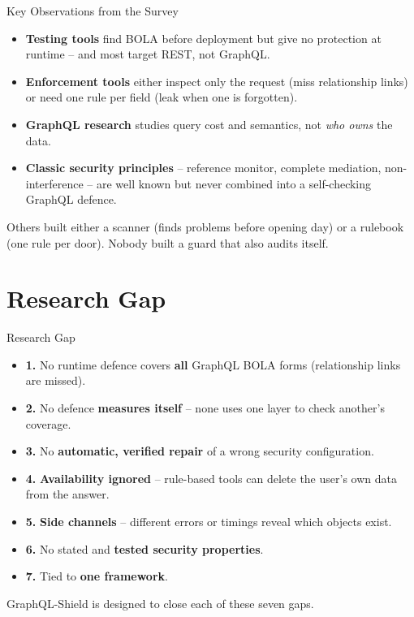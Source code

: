 \documentclass[aspectratio=169,11pt]{beamer}
\begin{document}
\begin{frame}{Key Observations from the Survey}
\begin{itemize}
\item \textbf{Testing tools} find BOLA before deployment but give no protection at runtime – and most target REST, not GraphQL.
\item \textbf{Enforcement tools} either inspect only the request (miss relationship links) or need one rule per field (leak when one is forgotten).
\item \textbf{GraphQL research} studies query cost and semantics, not \emph{who owns} the data.
\item \textbf{Classic security principles} – reference monitor, complete mediation, non-interference – are well known but never combined into a self-checking GraphQL defence.
\end{itemize}
\vfill
\begin{simplebox}Others built either a scanner (finds problems before opening day) or a rulebook (one rule per door). Nobody built a guard that also audits itself.\end{simplebox}
\end{frame}

\section{Research Gap}
\begin{frame}{Research Gap}
\begin{itemize}
\item \textbf{1.} No runtime defence covers \textbf{all} GraphQL BOLA forms (relationship links are missed).
\item \textbf{2.} No defence \textbf{measures itself} – none uses one layer to check another’s coverage.
\item \textbf{3.} No \textbf{automatic, verified repair} of a wrong security configuration.
\item \textbf{4.} \textbf{Availability ignored} – rule-based tools can delete the user’s own data from the answer.
\item \textbf{5.} \textbf{Side channels} – different errors or timings reveal which objects exist.
\item \textbf{6.} No stated and \textbf{tested security properties}.
\item \textbf{7.} Tied to \textbf{one framework}.
\end{itemize}
\vfill
\begin{simplebox}GraphQL-Shield is designed to close each of these seven gaps.\end{simplebox}
\end{frame}
\end{document}

